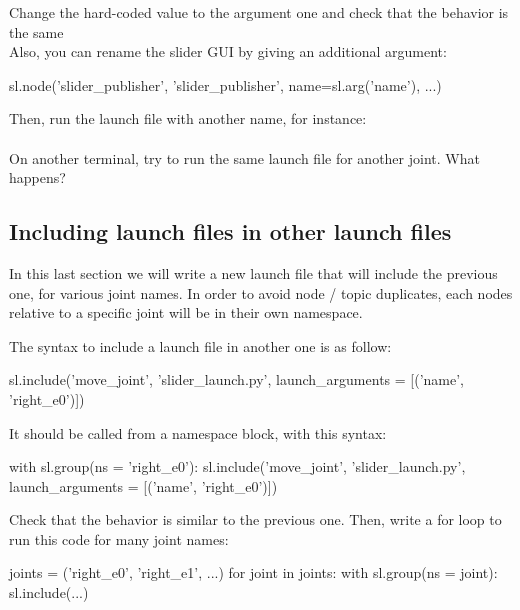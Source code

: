 \documentclass{ecnreport}
\begin{document}
Change the hard-coded value to the argument one  and check that the behavior is the same\\

Also, you can rename the slider GUI by giving an additional argument:
\begin{pythoncodelarge}
sl.node('slider_publisher', 'slider_publisher', name=sl.arg('name'), ...)
\end{pythoncodelarge}

Then, run the launch file with another name, for instance:\\ \\
On another terminal, try to run the same launch file for another joint. What happens?\\



\subsection{Including launch files in other launch files}

In this last section we will write a new launch file that will include the previous one, for various joint names. In order to avoid node / topic duplicates, each nodes relative to a specific joint will be in their own namespace. 

The syntax to include a launch file in another one is as follow:
\begin{pythoncodelarge}
sl.include('move_joint', 'slider_launch.py', launch_arguments = [('name', 'right_e0')])
\end{pythoncodelarge}

It should be called from a namespace block, with this syntax:
\begin{pythoncodelarge}
with sl.group(ns = 'right_e0'):
  sl.include('move_joint', 'slider_launch.py', launch_arguments = [('name', 'right_e0')])
\end{pythoncodelarge}

Check that the behavior is similar to the previous one. Then, write a for loop to run this code for many joint names:
\begin{pythoncodelarge}
joints = ('right_e0', 'right_e1', ...)
for joint in joints:
    with sl.group(ns = joint):
        sl.include(...)
\end{pythoncodelarge}
\end{document}
